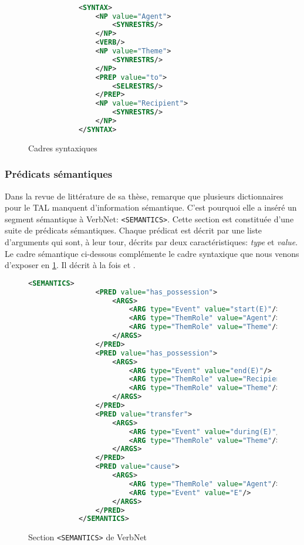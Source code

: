 \begin{figure}[htb]
  \caption{Cadres syntaxiques}
	\label{cadresynt}
\begin{lstlisting}[language=Xml]

            <SYNTAX>
                <NP value="Agent">
                    <SYNRESTRS/>
                </NP>
                <VERB/>
                <NP value="Theme">
                    <SYNRESTRS/>
                </NP>
                <PREP value="to">
                    <SELRESTRS/>
                </PREP>
                <NP value="Recipient">
                    <SYNRESTRS/>
                </NP>
            </SYNTAX>
\end{lstlisting}
\end{figure}

\subsubsection{Prédicats sémantiques}
Dans la revue de littérature de sa thèse, \cite{SchulerVerbnetBroadcoverageComprehensive2005} remarque que plusieurs dictionnaires pour le \ac{TAL} manquent d'information sémantique. C'est pourquoi elle a inséré un segment sémantique à VerbNet: \lstinline{<SEMANTICS>}. Cette section est constituée d'une suite de prédicats sémantiques. Chaque prédicat est décrit par une liste d'arguments qui sont, à leur tour, décrits par deux caractéristiques: \emph{type} et \emph{value}. Le cadre sémantique ci-dessous complémente le cadre syntaxique que nous venons d'exposer en \ref{cadresynt}. Il décrit à la fois  et .

\begin{figure}[htb]
  \caption{Section \texttt{<SEMANTICS>} de VerbNet}
	\label{cadresem}
\begin{lstlisting}[language=Xml]
<SEMANTICS>
                <PRED value="has_possession">
                    <ARGS>
                        <ARG type="Event" value="start(E)"/>
                        <ARG type="ThemRole" value="Agent"/>
                        <ARG type="ThemRole" value="Theme"/>
                    </ARGS>
                </PRED>
                <PRED value="has_possession">
                    <ARGS>
                        <ARG type="Event" value="end(E)"/>
                        <ARG type="ThemRole" value="Recipient"/>
                        <ARG type="ThemRole" value="Theme"/>
                    </ARGS>
                </PRED>
                <PRED value="transfer">
                    <ARGS>
                        <ARG type="Event" value="during(E)"/>
                        <ARG type="ThemRole" value="Theme"/>
                    </ARGS>
                </PRED>
                <PRED value="cause">
                    <ARGS>
                        <ARG type="ThemRole" value="Agent"/>
                        <ARG type="Event" value="E"/>
                    </ARGS>
                </PRED>
            </SEMANTICS>
\end{lstlisting}
\end{figure}

